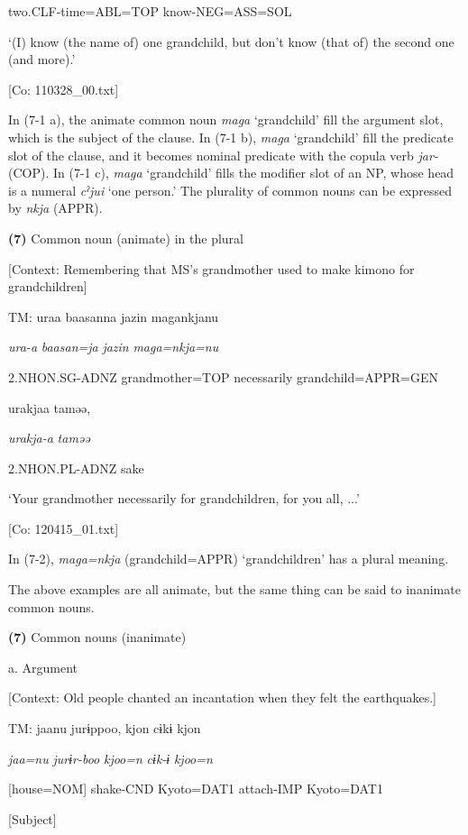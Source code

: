       two.CLF-time=ABL=TOP  know-NEG=ASS=SOL

      ‘(I) know (the name of) one grandchild, but don’t know (that of) the second one (and more).’

      [Co: 110328\_00.txt]

In (7-1 a), the animate common noun \textit{maga} ‘grandchild’ fill the argument slot, which is the subject of the clause. In (7-1 b), \textit{maga} ‘grandchild’ fill the predicate slot of the clause, and it becomes nominal predicate with the copula verb \textit{jar-} (COP). In (7-1 c), \textit{maga} ‘grandchild’ fills the modifier slot of an NP, whose head is a numeral \textit{cˀjui} ‘one person.’ The plurality of common nouns can be expressed by \textit{nkja} (APPR).

\textbf{(7)}  Common noun (animate) in the plural

  [Context: Remembering that MS’s grandmother used to make kimono for grandchildren]

  TM:  uraa  baasanna  jazin  magankjanu

    \textit{ura-a}  \textit{baasan=ja}  \textit{jazin}  \textit{maga=nkja=nu}

    2.NHON.SG-ADNZ  grandmother=TOP  necessarily  grandchild=APPR=GEN

    urakjaa  taməə,

    \textit{urakja-a}  \textit{taməə}

    2.NHON.PL-ADNZ  sake

    ‘Your grandmother necessarily for grandchildren, for you all, ...’

    [Co: 120415\_01.txt]

In (7-2), \textit{maga=nkja} (grandchild=APPR) ‘grandchildren’ has a plural meaning.

  The above examples are all animate, but the same thing can be said to inanimate common nouns.

\textbf{(7)}  Common nouns (inanimate)

  a.  Argument

    [Context: Old people chanted an incantation when they felt the earthquakes.]

    TM:  jaanu  jurɨppoo,  kjon  cɨkɨ  kjon

      \textit{jaa=nu}  \textit{jurɨr-boo}  \textit{kjoo=n}  \textit{cɨk-ɨ}  \textit{kjoo=n}

      [house=NOM]  shake-CND  Kyoto=DAT1  attach-IMP  Kyoto=DAT1

      [Subject]        

